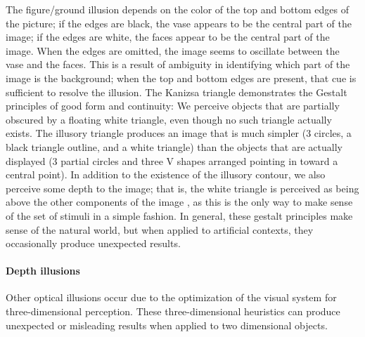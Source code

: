 \documentclass[11pt]{isuthesis}\usepackage[]{graphicx}\usepackage[]{color}
\begin{document}
The figure/ground illusion depends on the color of the top and bottom edges of the picture; if the edges are black, the vase appears to be the central part of the image; if the edges are white, the faces appear to be the central part of the image. When the edges are omitted, the image seems to oscillate between the vase and the faces. This is a result of ambiguity in identifying which part of the image is the background; when the top and bottom edges are present, that cue is sufficient to resolve the illusion. The Kanizsa triangle demonstrates the Gestalt principles of good form and continuity: We perceive objects that are partially obscured by a floating white triangle, even though no such triangle actually exists. The illusory triangle produces an image that is much simpler (3 circles, a black triangle outline, and a white triangle) than the objects that are actually displayed (3 partial circles and three V shapes arranged pointing in toward a central point). In addition to the existence of the illusory contour, we also perceive some depth to the image; that is, the white triangle is perceived as being above the other components of the image \citep{coren1983subjective}, as this is the only way to make sense of the set of stimuli in a simple fashion. In general, these gestalt principles make sense of the natural world, but when applied to artificial contexts, they occasionally produce unexpected results. 

\paragraph{Depth illusions} Other optical illusions occur due to the optimization of the visual system for three-dimensional perception. These three-dimensional heuristics can produce unexpected or misleading results when applied to two dimensional objects. 
\end{document}
